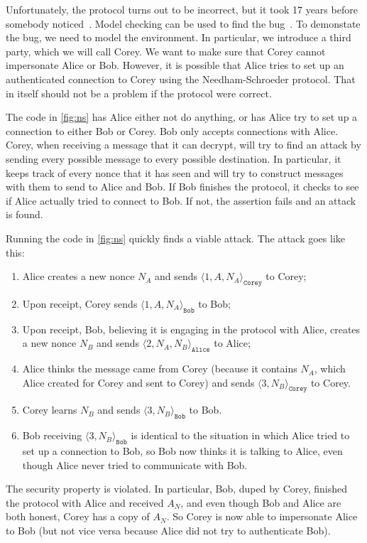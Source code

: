 \documentclass{report}
\begin{document}
Unfortunately, the protocol turns out to be incorrect, but it took 17 years before
somebody noticed~\cite{Lowe95}.  Model checking can be used to find the bug~\cite{Lowe96}.
To demonstate the bug, we need to model the environment.
In particular, we introduce a third party, which we will call Corey.
We want to make sure that Corey cannot impersonate Alice or Bob.
However, it is possible that Alice tries to set up an authenticated connection to Corey
using the Needham-Schroeder protocol.  That in itself should not be a problem if the
protocol were correct.

The code in \autoref{fig:ns} has Alice either not do anything, or has Alice try to set
up a connection to either Bob
or Corey.  Bob only accepts connections with Alice.  Corey, when receiving a message
that it can decrypt, will try to find an attack by sending every possible message to
every possible destination.  In particular, it keeps track of every nonce that it has
seen and will try to construct messages with them to send to Alice and Bob.
If Bob finishes the protocol, it checks to see if Alice actually tried to connect
to Bob.  If not, the assertion fails and an attack is found.

Running the code in \autoref{fig:ns} quickly finds a viable attack.  The attack goes
like this:

\begin{enumerate}
\item Alice creates a new nonce $N_A$ and sends $\langle 1, A, N_A \rangle_\mathtt{Corey}$
to Corey;
\item Upon receipt, Corey sends $\langle 1, A, N_A \rangle_\mathtt{Bob}$ to Bob;
\item Upon receipt, Bob, believing it is engaging in the protocol with Alice,
creates a new nonce $N_B$ and sends
$\langle 2, N_A, N_B \rangle_\mathtt{Alice}$ to Alice;
\item Alice thinks the message came from Corey (because it contains $N_A$, which
Alice created for Corey and sent to Corey) and
sends $\langle 3, N_B \rangle_\mathtt{Corey}$ to Corey.
\item Corey learns $N_B$ and sends $\langle 3, N_B \rangle_\mathtt{Bob}$ to Bob.
\item Bob receiving $\langle 3, N_B \rangle_\mathtt{Bob}$ is identical to the
situation in which Alice tried to set up a connection to Bob,
so Bob now thinks it is talking to Alice, even though Alice never tried to
communicate with Bob.
\end{enumerate}
The security property is violated.  In particular, Bob, duped by Corey, finished
the protocol with Alice and received $A_N$, and even though Bob and Alice
are both honest, Corey has a copy of $A_N$.  So Corey is now able to impersonate
Alice to Bob (but not vice versa because Alice did not try to authenticate Bob).
\end{document}

